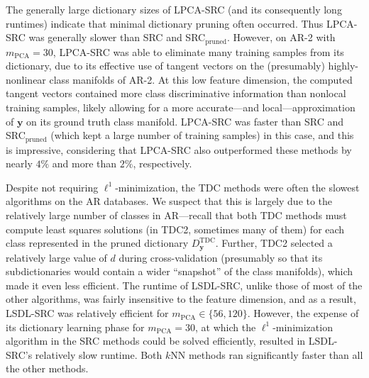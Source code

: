 \documentclass[review]{elsarticle}
\begin{document}
The generally large dictionary sizes of LPCA-SRC (and its consequently long runtimes) indicate that minimal dictionary pruning often occurred. Thus LPCA-SRC was generally slower than SRC and SRC$_\mathrm{pruned}$. However, on AR-2 with $m_\mathrm{PCA}=30$, LPCA-SRC was able to eliminate many training samples from its dictionary, due to its effective use of tangent vectors on the (presumably) highly-nonlinear class manifolds of AR-2. At this low feature dimension, the computed tangent vectors contained more class discriminative information than nonlocal training samples, likely allowing for a more accurate---and local---approximation of $\bm{y}$ on its ground truth class manifold. LPCA-SRC was faster than SRC and SRC$_\mathrm{pruned}$ (which kept a large number of training samples) in this case, and this is impressive, considering that LPCA-SRC also outperformed these methods by nearly $4\%$ and more than $2\%$, respectively.


Despite not requiring $\ell^1$-minimization, the TDC methods were often the slowest algorithms on the AR databases. We suspect that this is largely due to the relatively large number of classes in AR---recall that both TDC methods must compute least squares solutions (in TDC2, sometimes many of them) for each class represented in the pruned dictionary $D_{\bm{y}}^{\mathrm{TDC}}$. Further, TDC2 selected a relatively large value of $d$ during cross-validation (presumably so that its subdictionaries would contain a wider ``snapshot'' of the class manifolds), which made it even less efficient. The runtime of LSDL-SRC, unlike those of most of the other algorithms, was fairly insensitive to the feature dimension, and as a result, LSDL-SRC was relatively efficient for $m_\mathrm{PCA} \in \{56,120\}$. However, the expense of its dictionary learning phase for $m_\mathrm{PCA}=30$, at which the $\ell^1$-minimization algorithm in the SRC methods could be solved efficiently, resulted in LSDL-SRC's relatively slow runtime. Both $k$NN methods ran significantly faster than all the other methods.
\end{document}
